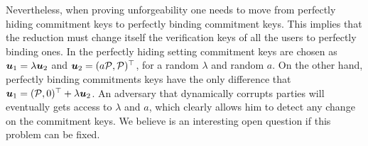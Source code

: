 Nevertheless, when proving unforgeability one needs to move from perfectly hiding commitment keys to perfectly binding commitment keys. This implies that the reduction must change itself the verification keys of all the users to perfectly binding ones. In the perfectly hiding setting commitment keys are chosen as ${\boldsymbol{u}}_1 = \lambda{\boldsymbol{u}}_2$ and ${\boldsymbol{u}}_2 = (a\mathcal{P},\mathcal{P})^\top$, for a random $\lambda$ and random $a$.  On the other hand, perfectly binding commitments keys have the only difference that ${\boldsymbol{u}}_1 = (\mathcal{P},0)^\top+\lambda{\boldsymbol{u}}_2$.
An adversary that dynamically corrupts parties will eventually gets access to $\lambda$ and $a$, which clearly allows him to detect any change on the commitment keys. We believe is an interesting open question if this problem can be fixed.


